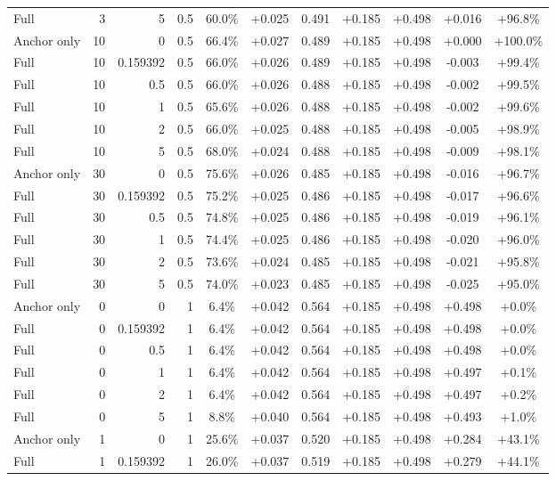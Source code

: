 \begin{table}[htbp]
\begin{tabular}{lrrrccccccc}
Full & 3 & 5 & 0.5 & 60.0\% & +0.025 & 0.491 & +0.185 & +0.498 & +0.016 & +96.8\% \\
Anchor only & 10 & 0 & 0.5 & 66.4\% & +0.027 & 0.489 & +0.185 & +0.498 & +0.000 & +100.0\% \\
Full & 10 & 0.159392 & 0.5 & 66.0\% & +0.026 & 0.489 & +0.185 & +0.498 & -0.003 & +99.4\% \\
Full & 10 & 0.5 & 0.5 & 66.0\% & +0.026 & 0.488 & +0.185 & +0.498 & -0.002 & +99.5\% \\
Full & 10 & 1 & 0.5 & 65.6\% & +0.026 & 0.488 & +0.185 & +0.498 & -0.002 & +99.6\% \\
Full & 10 & 2 & 0.5 & 66.0\% & +0.025 & 0.488 & +0.185 & +0.498 & -0.005 & +98.9\% \\
Full & 10 & 5 & 0.5 & 68.0\% & +0.024 & 0.488 & +0.185 & +0.498 & -0.009 & +98.1\% \\
Anchor only & 30 & 0 & 0.5 & 75.6\% & +0.026 & 0.485 & +0.185 & +0.498 & -0.016 & +96.7\% \\
Full & 30 & 0.159392 & 0.5 & 75.2\% & +0.025 & 0.486 & +0.185 & +0.498 & -0.017 & +96.6\% \\
Full & 30 & 0.5 & 0.5 & 74.8\% & +0.025 & 0.486 & +0.185 & +0.498 & -0.019 & +96.1\% \\
Full & 30 & 1 & 0.5 & 74.4\% & +0.025 & 0.486 & +0.185 & +0.498 & -0.020 & +96.0\% \\
Full & 30 & 2 & 0.5 & 73.6\% & +0.024 & 0.485 & +0.185 & +0.498 & -0.021 & +95.8\% \\
Full & 30 & 5 & 0.5 & 74.0\% & +0.023 & 0.485 & +0.185 & +0.498 & -0.025 & +95.0\% \\
Anchor only & 0 & 0 & 1 & 6.4\% & +0.042 & 0.564 & +0.185 & +0.498 & +0.498 & +0.0\% \\
Full & 0 & 0.159392 & 1 & 6.4\% & +0.042 & 0.564 & +0.185 & +0.498 & +0.498 & +0.0\% \\
Full & 0 & 0.5 & 1 & 6.4\% & +0.042 & 0.564 & +0.185 & +0.498 & +0.498 & +0.0\% \\
Full & 0 & 1 & 1 & 6.4\% & +0.042 & 0.564 & +0.185 & +0.498 & +0.497 & +0.1\% \\
Full & 0 & 2 & 1 & 6.4\% & +0.042 & 0.564 & +0.185 & +0.498 & +0.497 & +0.2\% \\
Full & 0 & 5 & 1 & 8.8\% & +0.040 & 0.564 & +0.185 & +0.498 & +0.493 & +1.0\% \\
Anchor only & 1 & 0 & 1 & 25.6\% & +0.037 & 0.520 & +0.185 & +0.498 & +0.284 & +43.1\% \\
Full & 1 & 0.159392 & 1 & 26.0\% & +0.037 & 0.519 & +0.185 & +0.498 & +0.279 & +44.1\% \\

\end{tabular}
\end{table}
